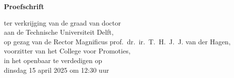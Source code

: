 \begin{titlepage}

\begin{center}

\vspace*{2\bigskipamount}

{\makeatletter
\titlestyle\bfseries\LARGE\@title
\makeatother}

{\makeatletter
\ifx\@subtitle\undefined\else
    \bigskip
    \titlefont\titleshape\Large\@subtitle
\fi
\makeatother}

\end{center}

\cleardoublepage
\thispagestyle{empty}

\begin{center}


\vspace*{2\bigskipamount}

{\makeatletter
\titlestyle\bfseries\LARGE\@title
\makeatother}

{\makeatletter
\ifx\@subtitle\undefined\else
    \bigskip
    \titlefont\titleshape\Large\@subtitle
\fi
\makeatother}

\vfill


{\Large\titlefont\bfseries Proefschrift}

\bigskip
\bigskip

ter verkrijging van de graad van doctor \\
aan de Technische Universiteit Delft, \\
op gezag van de Rector Magnificus prof.\ dr.\ ir.\ T.\ H.\ J.\ J. van der Hagen, \\
voorzitter van het College voor Promoties, \\
in het openbaar te verdedigen op \\
dinsdag 15 april 2025 om 12:30 uur


\end{center}
\end{titlepage}
